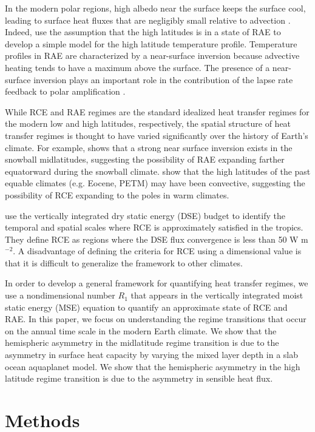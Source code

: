 \documentclass{ametsocV5}
\begin{document}
    In the modern polar regions, high albedo near the surface keeps the surface cool, leading to surface heat fluxes that are negligibly small relative to advection \citep{nakamura1988}. Indeed, \cite{cronin2016} use the assumption that the high latitudes is in a state of RAE to develop a simple model for the high latitude temperature profile. Temperature profiles in RAE are characterized by a near-surface inversion because advective heating tends to have a maximum above the surface. The presence of a near-surface inversion plays an important role in the contribution of the lapse rate feedback to polar amplification \cite{pithan2014,payne2015}.
    
    While RCE and RAE regimes are the standard idealized heat transfer regimes for the modern low and high latitudes, respectively, the spatial structure of heat transfer regimes is thought to have varied significantly over the history of Earth's climate. For example, \cite{pierrehumbert2005} shows that a strong near surface inversion exists in the snowball midlatitudes, suggesting the possibility of RAE expanding farther equatorward during the snowball climate. \cite{abbot2008} show that the high latitudes of the past equable climates (e.g. Eocene, PETM) may have been convective, suggesting the possibility of RCE expanding to the poles in warm climates.
    
    \cite{jakob2019} use the vertically integrated dry static energy (DSE) budget to identify the temporal and spatial scales where RCE is approximately satisfied in the tropics. They define RCE as regions where the DSE flux convergence is less than 50 W m$^{-2}$. A disadvantage of defining the criteria for RCE using a dimensional value is that it is difficult to generalize the framework to other climates.
    
    In order to develop a general framework for quantifying heat transfer regimes, we use a nondimensional number \(R_{1}\) that appears in the vertically integrated moist static energy (MSE) equation to quantify an approximate state of RCE and RAE. In this paper, we focus on understanding the regime transitions that occur on the annual time scale in the modern Earth climate. We show that the hemispheric asymmetry in the midlatitude regime transition is due to the asymmetry in surface heat capacity by varying the mixed layer depth in a slab ocean aquaplanet model. We show that the hemispheric asymmetry in the high latitude regime transition is due to the asymmetry in sensible heat flux.

\section{Methods}
\end{document}
